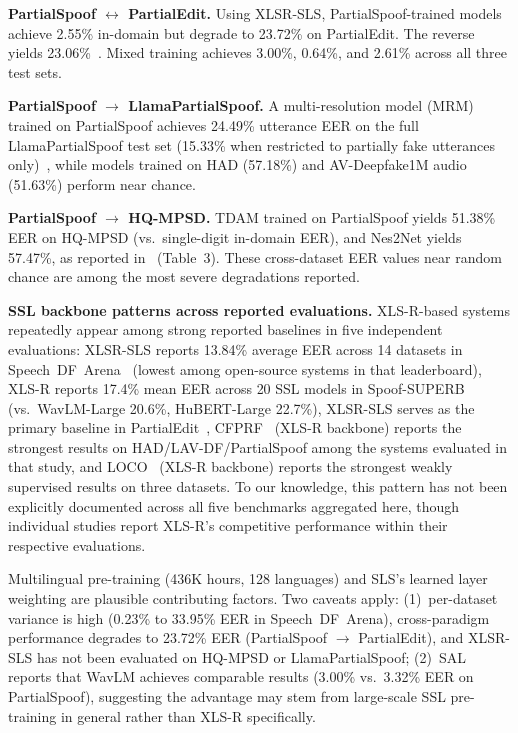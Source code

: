 \documentclass[journal]{IEEEtran}
\begin{document}
\textbf{PartialSpoof $\leftrightarrow$ PartialEdit.} Using XLSR-SLS, PartialSpoof-trained models achieve 2.55\% in-domain but degrade to 23.72\% on PartialEdit. The reverse yields 23.06\%~\cite{zhang2025partialedit}. Mixed training achieves 3.00\%, 0.64\%, and 2.61\% across all three test sets.

\textbf{PartialSpoof $\rightarrow$ LlamaPartialSpoof.} A multi-resolution model (MRM) trained on PartialSpoof achieves 24.49\% utterance EER on the full LlamaPartialSpoof test set (15.33\% when restricted to partially fake utterances only)~\cite[Tables~III(a) and~IV]{luong2025llamapartialspoof}, while models trained on HAD (57.18\%) and AV-Deepfake1M audio (51.63\%) perform near chance.

\textbf{PartialSpoof $\rightarrow$ HQ-MPSD.} TDAM trained on PartialSpoof yields 51.38\% EER on HQ-MPSD (vs.\ single-digit in-domain EER), and Nes2Net yields 57.47\%, as reported in~\cite{li2025hqmpsd} (Table~3). These cross-dataset EER values near random chance are among the most severe degradations reported.

\textbf{SSL backbone patterns across reported evaluations.} XLS-R-based systems repeatedly appear among strong reported baselines in five independent evaluations: XLSR-SLS reports 13.84\% average EER across 14 datasets in Speech~DF~Arena~\cite{speechdfarena2025} (lowest among open-source systems in that leaderboard), XLS-R reports 17.4\% mean EER across 20 SSL models in Spoof-SUPERB~\cite{ali2026spoofsuperb} (vs.\ WavLM-Large 20.6\%, HuBERT-Large 22.7\%), XLSR-SLS serves as the primary baseline in PartialEdit~\cite{zhang2025partialedit}, CFPRF~\cite{wu2024cfprf} (XLS-R backbone) reports the strongest results on HAD/LAV-DF/PartialSpoof among the systems evaluated in that study, and LOCO~\cite{10.24963/ijcai.2025/65} (XLS-R backbone) reports the strongest weakly supervised results on three datasets. To our knowledge, this pattern has not been explicitly documented across all five benchmarks aggregated here, though individual studies report XLS-R's competitive performance within their respective evaluations.

Multilingual pre-training (436K hours, 128 languages) and SLS's learned layer weighting are plausible contributing factors. Two caveats apply: (1)~per-dataset variance is high (0.23\% to 33.95\% EER in Speech~DF~Arena), cross-paradigm performance degrades to 23.72\% EER (PartialSpoof $\rightarrow$ PartialEdit), and XLSR-SLS has not been evaluated on HQ-MPSD or LlamaPartialSpoof; (2)~SAL~\cite{sal2026} reports that WavLM achieves comparable results (3.00\% vs.\ 3.32\% EER on PartialSpoof), suggesting the advantage may stem from large-scale SSL pre-training in general rather than XLS-R specifically.
\end{document}
